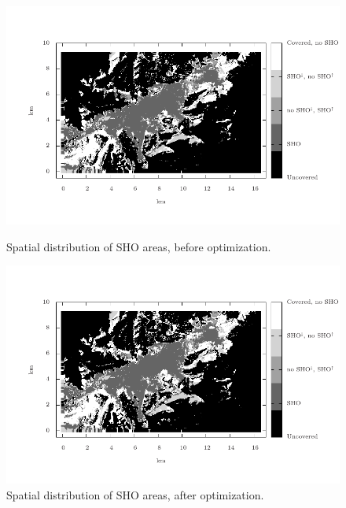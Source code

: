 \begin{figure}
\centering

\begin{minipage}[t]{0.5\textwidth}%
\centering

\includegraphics[width=1\textwidth]{07-experimental_evaluation-sho_balancing/img/sho_areas_initial}\vskip -0.3in

\caption{Spatial distribution of SHO areas, before optimization.\label{fig:sho_areas_initial}}
%
\end{minipage}\hfill{}%
\begin{minipage}[t]{0.5\textwidth}%
\centering

\includegraphics[width=1\textwidth]{07-experimental_evaluation-sho_balancing/img/sho_areas_final}\vskip -0.3in

\caption{Spatial distribution of SHO areas, after optimization.\label{fig:sho_areas_final}}
%
\end{minipage}
\end{figure}


